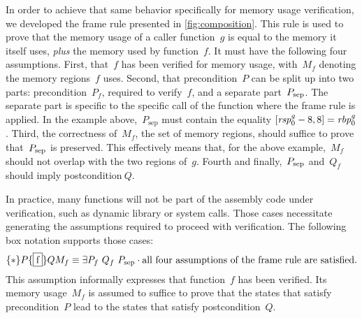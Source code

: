 In order to achieve that same behavior specifically for memory usage verification,%
we developed the frame rule presented in \cref{fig:composition}.
This rule is used to prove that the memory usage of a caller function~$g$
is equal to the memory it itself uses, \emph{plus} the memory used by function~$f$.
It must have the following four assumptions.
First, that~$f$ has been verified for memory usage,
with~$M_f$ denoting the memory regions~$f$ uses.%
Second, that precondition~$P$ can be split up into two parts:
precondition~$P_f$, required to verify~$f$, and a separate part~$\psep$.
The separate part is specific to the specific call of the function
where the frame rule is applied.%
In the example above,~$P_\mathrm{sep}$ must contain the equality
$\region{\rspo^g-8}{8}=\rbpo^g$.
Third, the correctness of~$M_f$, the set of memory regions,
should suffice to prove that~$\psep$ is preserved.
This effectively means that, for the above example,~$M_f$
should not overlap with the two regions of~$g$.
Fourth and finally,~$\psep$ and~$Q_f$ should imply postcondition$~Q$.
\begin{figure*}
  \begin{prooftree}
  \end{prooftree}
  \caption{Frame rule for composition of memory usage}\label{fig:composition}
\end{figure*}

In practice, many functions will not be part of the assembly code under verification, such as dynamic library or system calls.
Those cases necessitate generating the assumptions required
to proceed with verification.
The following box notation supports those cases:
\begin{equation}
  \htriple*P{\fbox f}Q{M_f}\equiv
  \exists P_f~Q_f~\psep\cdot
  \text{all four assumptions of the frame rule are satisfied}.
\end{equation}
This assumption informally expresses that function~$f$ has been verified.
Its memory usage~$M_f$ is assumed to suffice to prove that
the states that satisfy precondition~$P$ lead to the states that satisfy
postcondition~$Q$.


